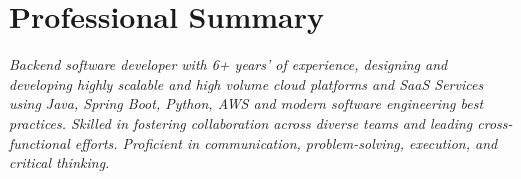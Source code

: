 \section{Professional Summary}
\small
\textit{Backend software developer with 6+ years' of experience, designing and developing highly scalable and high volume cloud platforms and SaaS Services using Java, Spring Boot, Python, AWS and modern software engineering best practices. Skilled in fostering collaboration across diverse teams and leading cross-functional efforts. Proficient in communication, problem-solving, execution, and critical thinking.}